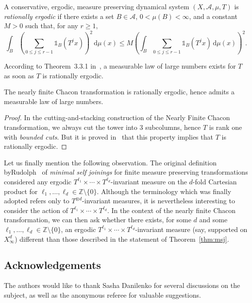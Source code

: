 \documentclass[AHL,Unicode,longabstracts]{cedram}
\newcommand{\ind}[1]{\mathds{1}_{#1}}
\newcommand{\ZZ}{\mathbb{Z}}
\newcommand{\A}{\mathscr{A}}
\newcommand*{\dd}{\mathrm{d}}
\begin{document}
\begin{defi}
A conservative, ergodic, measure preserving dynamical system $(X,\A,\mu,T)$ is \emph{rationally ergodic} if there exists a set $B\in\A$, $0<\mu(B)<\infty$, and a constant $M>0$ such that, for any $r\ge1$,
\[
\int_B \left(\sum_{0\le j\le r-1}\ind{B}(T^jx)\right)^2 \, \dd\mu(x) \le M \left(\int_B \sum_{0\le j\le r-1}\ind{B}(T^jx) \, \dd\mu(x)\right)^2.
\]
\end{defi}

According to Theorem~3.3.1 in~\cite{Aaronson}, a measurable law of large numbers exists for $T$ as soon as $T$ is rationally ergodic.


\begin{prop}\label{prop:rational_ergodicity}
The nearly finite Chacon transformation is rationally ergodic, hence admits a measurable law of large numbers.
\end{prop}

\begin{proof}
In the cutting-and-stacking construction of the Nearly Finite Chacon transformation, we always cut the tower into 3 subcolumns, hence $T$ is rank one with \emph{bounded cuts}. But it is proved in~\cite[Theorem~2.3]{BSSSW2015} that this property implies that $T$ is rationally ergodic.
\end{proof}

Let us finally mention the following observation. The original definition by\linebreak Rudolph~\cite{Rudolph79} of \emph{minimal self joinings} for finite measure preserving transformations considered any ergodic $T^{\ell_1}\times\cdots \times T^{\ell_d}$-invariant measure on the $d$-fold Cartesian product for $\ell_1,\ldots,\ell_d\in\ZZ\setminus\{0\}$. Although the terminology which was finally adopted refers only to $T^{\otimes d}$-invariant measures, it is nevertheless interesting to consider the action of $T^{\ell_1}\times\cdots \times T^{\ell_d}$. In the context of the nearly finite Chacon transformation, we can then ask whether there exists, for some $d$ and some $\ell_1,\ldots,\ell_d\in\ZZ\setminus\{0\}$, an ergodic $T^{\ell_1}\times\cdots \times T^{\ell_d}$-invariant measure (say, supported on $X_\infty^d$) different than those described in the statement of Theorem~\ref{thm:msj}.


\subsection*{Acknowledgements} The authors would like to thank Sasha Danilenko for several discussions on the subject, as well as the anonymous referee for valuable suggestions.



\end{document}
